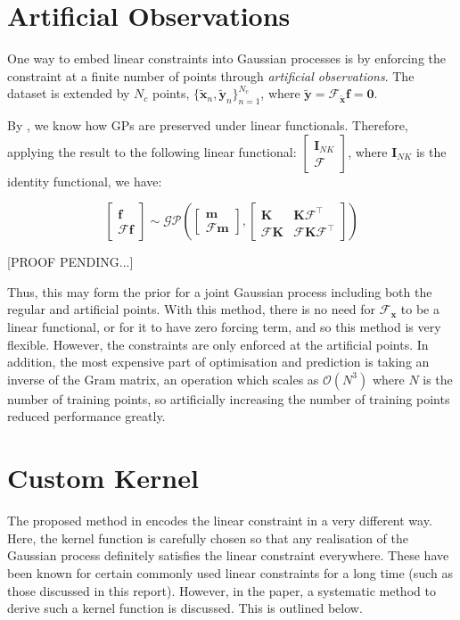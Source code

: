 \documentclass[12pt,a4paper,twoside]{report}
\theoremstyle{definition}
\newcommand{\f}{\mathscr F_\mathbf x}
\begin{document}
\section{Artificial Observations}
One way to embed linear constraints into Gaussian processes is by enforcing the constraint at a finite number of points through \emph{artificial observations}. The dataset is extended by $N_c$ points, $\{ \mathbf{ \tilde x}_n,  \mathbf{ \tilde y}_n\}_{n=1}^{N_c}$, where $\mathbf{ \tilde y} = \mathscr F_{\mathbf{\tilde{x}}} \mathbf f = \mathbf 0$.

By , we know how GPs are preserved under linear functionals. Therefore, applying the result to the following linear functional: $\begin{bmatrix} \mathbf I_{NK}\\\mathscr F \end{bmatrix}$, where $\mathbf I_{NK}$ is the identity functional, we have:

$$\begin{bmatrix} \mathbf f\\\mathscr F \mathbf f \end{bmatrix}\sim \mathcal {GP}\left( \begin{bmatrix} \mathbf m\\ \mathscr F \mathbf m \end{bmatrix}, \begin{bmatrix} \mathbf  K & \mathbf K \mathscr{F}^\top \\ \mathscr F \mathbf K & \mathscr F \mathbf K \mathscr{F}^\top \end{bmatrix}  \right)  $$

[PROOF PENDING...]

Thus, this may form the prior for a joint Gaussian process including both the regular and artificial points. With this method, there is no need for $\f$ to be a linear functional, or for it to have zero forcing term, and so this method is very flexible. However, the constraints are only enforced at the artificial points. In addition, the most expensive part of optimisation and prediction is taking an inverse of the Gram matrix, an operation which scales as $\mathcal O(N^3)$ where $N$ is the number of training points, so artificially increasing the number of training points reduced performance greatly.

\section{Custom Kernel}\label{custom}
The proposed method in \cite{Jidling} encodes the linear constraint in a very different way. Here, the kernel function is carefully chosen so that any realisation of the Gaussian process definitely satisfies the linear constraint everywhere. These have been known for certain commonly used linear constraints for a long time (such as those discussed in this report). However, in the paper, a systematic method to derive such a kernel function is discussed. This is outlined below.
\end{document}
